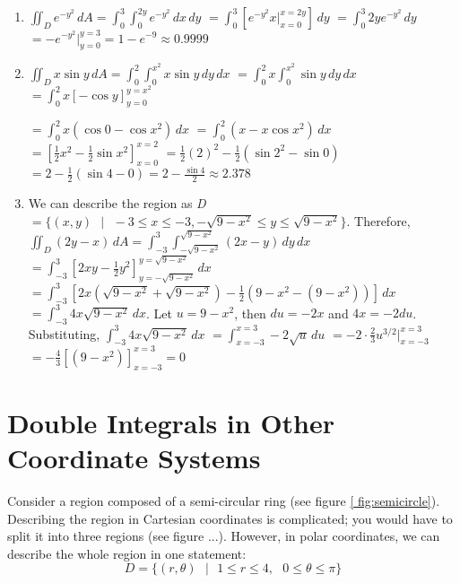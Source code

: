 \begin{Answer}[ref = non-rect]
\begin{enumerate}
    \item $\iint_{\textit{D}} e^{-y^2} \,dA = \int_0^3 \int_{0}^{2y} e^{-y^2}\,
    dx\,dy$ $= \int_0^3 \left[ e^{-y^2} x|_{x = 0}^{x = 2y} \right]\,dy$ $= 
    \int_0^3 2y e^{-y^2}\,dy$ $= -e^{-y^2}|_{y = 0}^{y = 3} = 1 - e^{-9} 
    \approx 0.9999$

    \item $\iint_{\textit{D}} x \sin{y}\,dA = \int_0^{2} \int_0^{x^2} x \sin{y}
    \,dy\,dx$ $= \int_0^{2} x \int_0^{x^2} \sin{y}\,dy\,dx$ $= \int_0^{2} x 
    \left[ -\cos{y} \right]_{y = 0}^{y = x^2}$ 
    
    $= \int_0^{2} x \left( \cos{0} -\cos{x^2} \right)\,dx$ $= \int_0^{2} \left(
    x - x\cos{x^2} \right)\,dx$ $= \left[ \frac{1}{2}x^2 - \frac{1}{2}\sin{x^2}
    \right]_{x = 0}^{x = 2}$ $= \frac{1}{2}(2)^2 - \frac{1}{2} \left( \sin{2^2}
    - \sin{0} \right)$ $= 2 - \frac{1}{2} \left( \sin{4} - 0 \right) = 2 - 
    \frac{\sin{4}}{2} \approx 2.378$

    \item We can describe the region as \textit{D} $= \{ (x, y) \text{ } | 
    \text{ } -3 \leq x \leq -3, -\sqrt{9 - x^2} \leq y \leq \sqrt{9 - x^2} \}$.
    Therefore, $\iint_{\textit{D}} \left(2y - x \right)\,dA = \int_{-3}^3 
    \int_{-\sqrt{9 - x^2}}^{\sqrt{9 - x^2}} \left( 2x - y \right)\,dy\,dx$ $= 
    \int_{-3}^3 \left[ 2xy - \frac{1}{2}y^2 \right]_{y = -\sqrt{9 - x^2}}^{y = 
    \sqrt{9 - x^2}}\,dx$ $= \int_{-3}^3 \left[ 2x \left( \sqrt{9 - x^2} + 
    \sqrt{9 - x^2} \right) - \frac{1}{2} \left( 9 - x^2 - \left(9 - x^2 \right) 
    \right) \right]\,dx$ $= \int_{-3}^3 4x\sqrt{9 - x^2}\,dx$. Let $u = 9 - 
    x^2$, then $du = -2x$ and $4x = -2du$. Substituting, $\int_{-3}^3 4x\sqrt{
    9 - x^2}\,dx$ $= \int_{x = -3}^{x = 3} -2\sqrt{u}\,du$ $= -2 \cdot 
    \frac{2}{3} u^{3/2}|_{x = -3}^{x = 3}$ $= -\frac{4}{3} \left[ \left( 9 - 
    x^2 \right) \right]_{x = -3}^{x = 3} = 0$
\end{enumerate}
\end{Answer}

\section{Double Integrals in Other Coordinate Systems}
Consider a region composed of a semi-circular ring (see figure \ref{
fig:semicircle}). Describing the region in Cartesian coordinates is 
complicated; you would have to split it into three regions (see figure ...). However, in polar coordinates, we can describe the whole region in one statement:
$$\textit{D} = \{(r, \theta)\text{ }|\text{ }1 \leq r \leq 4,\text{ }0 \leq 
\theta \leq \pi\}$$

